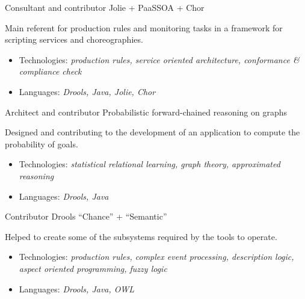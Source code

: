 %
{Consultant and contributor}%
{Jolie + PaaSSOA + Chor}{}{}{Main referent for production rules and monitoring tasks in a framework for scripting services and choreographies.\begin{itemize}
\item Technologies: \emph{production rules, service oriented architecture, conformance \& compliance check}
\item Languages: \emph{Drools, Java, Jolie, Chor}
\end{itemize}}

%
{Architect and contributor}%
{Probabilistic forward\--chained reasoning on graphs}{}{}{Designed and contributing to the development of an application to compute the probability of goals.\begin{itemize}
\item Technologies: \emph{statistical relational learning, graph theory, approximated reasoning}
\item Languages: \emph{Drools, Java}
\end{itemize}}

%
{Contributor}%
{Drools ``Chance'' + ``Semantic''}{}{}{Helped to create some of the subsystems required by the tools to operate.\begin{itemize}
\item Technologies: \emph{production rules, complex event processing, description logic, aspect oriented programming, fuzzy logic}
\item Languages: \emph{Drools, Java, OWL}
\end{itemize}}



\iffalse
\cventry{year--year}{Job title}{Employer}{City}{}{Description lines}
\cventry{Entry 1}{Entry 2}{Entry 3}{Entry 4}{Entry 5}{Entry 6}

\cventry{year--year}{Job title}{Employer}{City}{}{General description no longer than 1--2 lines.\newline{}%
Detailed achievements:%
\begin{itemize}%
\item Achievement 1;
\item Achievement 2, with sub-achievements:
  \begin{itemize}%
  \item Sub-achievement (a);
  \item Sub-achievement (b), with sub-sub-achievements (don't do this!);
    \begin{itemize}
    \item Sub-sub-achievement i;
    \item Sub-sub-achievement ii;
    \item Sub-sub-achievement iii;
    \end{itemize}
  \item Sub-achievement (c);
  \end{itemize}
\item Achievement 3.
\end{itemize}}
\cventry{year--year}{Job title}{Employer}{City}{}{Description line 1\newline{}Description line 2}

\subsection{Miscellaneous}
\cventry{year--year}{Job title}{Employer}{City}{}{Description}
\fi